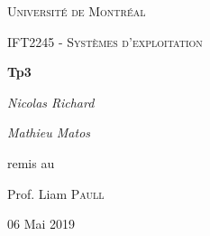 \documentclass[12pt]{article}
\begin{document}
\begin{titlepage}
    \centering
    {\scshape\LARGE Université de Montréal \par}
    \vspace{1cm}
    {\scshape\large IFT2245 - Systèmes d'exploitation \par}
    \vspace{2cm}
    {\huge\bfseries Tp3 \par}
    \vspace{1.5cm}
    {\large\itshape Nicolas Richard \par}
    \vspace{0.7cm}
    {\large\itshape Mathieu Matos \par}

    \vfill
    remis au\par
    Prof. Liam \textsc{Paull}
    \vfill
    {\large 06 Mai 2019 \par}
\end{titlepage}
\end{document}

